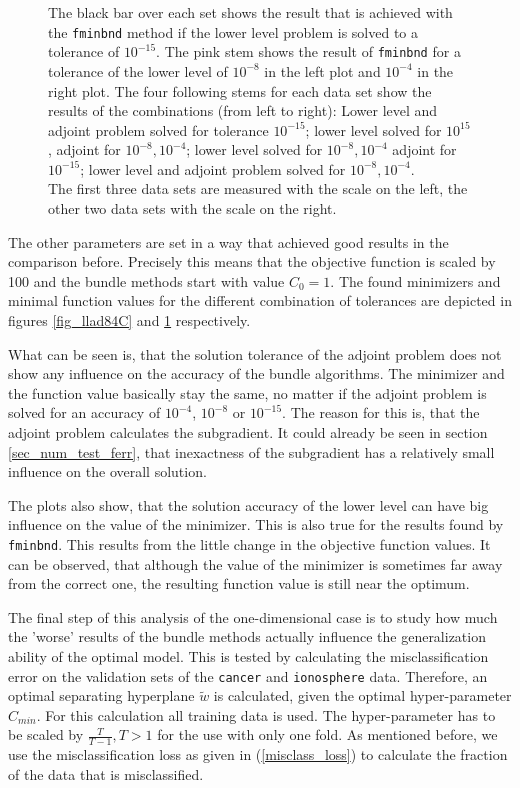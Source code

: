 \begin{figure}[ht]
{	The black bar over each set shows the result that is achieved with the \textup{\texttt{fminbnd}} method if the lower level problem is solved to a tolerance of \(10^{-15}\). The pink stem shows the result of \textup{\texttt{fminbnd}} for a tolerance of the lower level of \(10^{-8}\) in the left plot and \(10^{-4}\) in the right plot. The four following stems for each data set show the results of the combinations (from left to right): Lower level and adjoint problem solved for tolerance \(10^{-15}\); lower level solved for \(10^{15}\), adjoint for \(10^{-8}, 10^{-4}\); lower level solved for \(10^{-8},10^{-4}\) adjoint for \(10^{-15}\); lower level and adjoint problem solved for \(10^{-8},10^{-4}\).\\
	The first three data sets are measured with the scale on the left, the other two data sets with the scale on the right.}%
	\label{fig_llad84f}%
\end{figure}

The other parameters are set in a way that achieved good results in the comparison before.
Precisely this means that the objective function is scaled by 100 and the bundle methods start with value \(C_0 = 1\). 
The found minimizers and minimal function values for the different combination of tolerances are depicted in figures \ref{fig_llad84C} and \ref{fig_llad84f} respectively.

What can be seen is, that the solution tolerance of the adjoint problem does not show any influence on the accuracy of the bundle algorithms. The minimizer and the function value basically stay the same, no matter if the adjoint problem is solved for an accuracy of \(10^{-4}\), \(10^{-8}\) or \(10^{-15}\).
The reason for this is, that the adjoint problem calculates the subgradient. It could already be seen in section \ref{sec_num_test_ferr}, that inexactness of the subgradient has a relatively small influence on the overall solution.

The plots also show, that the solution accuracy of the lower level can have big influence on the value of the minimizer. This is also true for the results found by \texttt{fminbnd}.
This results from the little change in the objective function values. It can be observed, that although the value of the minimizer is sometimes far away from the correct one, the resulting function value is still near the optimum.

The final step of this analysis of the one-dimensional case is to study how much the 'worse' results of the bundle methods actually influence the generalization ability of the optimal model.
This is tested by calculating the misclassification error on the validation sets of the \texttt{cancer} and \texttt{ionosphere} data.
Therefore, an optimal separating hyperplane \(\tilde{w}\) is calculated, given the optimal hyper-parameter \(C_{min}\). For this calculation all training data is used. The hyper-parameter has to be scaled by \(\frac{T}{T-1}, T >1\) \cite[p. 47]{Kunapuli2008} for the use with only one fold. 
As mentioned before, we use the misclassification loss as given in (\ref{misclass_loss}) to calculate the fraction of the data that is misclassified.

